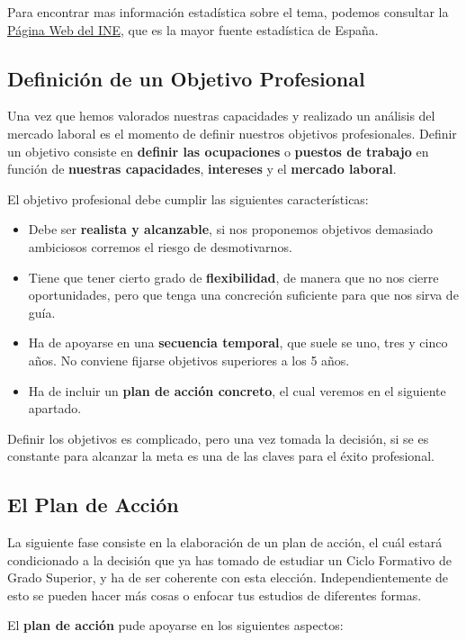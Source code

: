 Para encontrar mas información estadística sobre el tema, podemos consultar la \href{https://www.ine.es/}{Página Web del INE}, que es la mayor fuente estadística de España.

\subsection{Definición de un Objetivo Profesional}
Una vez que hemos valorados nuestras capacidades y realizado un análisis del mercado laboral es el momento de definir nuestros objetivos profesionales. Definir un objetivo consiste en \textbf{definir las ocupaciones} o \textbf{puestos de trabajo} en función de \textbf{nuestras capacidades}, \textbf{intereses} y el \textbf{mercado laboral}.

El objetivo profesional debe cumplir las siguientes características:

\begin{itemize}
    \item Debe ser \textbf{realista y alcanzable}, si nos proponemos objetivos demasiado ambiciosos corremos el riesgo de desmotivarnos.
    \item Tiene que tener cierto grado de \textbf{flexibilidad}, de manera que no nos cierre oportunidades, pero que tenga una concreción suficiente para que nos sirva de guía.
    \item Ha de apoyarse en una \textbf{secuencia temporal}, que suele se uno, tres y cinco años. No conviene fijarse objetivos superiores a los 5 años.
    \item Ha de incluir un \textbf{plan de acción concreto}, el cual veremos en el siguiente apartado.
\end{itemize}

Definir los objetivos es complicado, pero una vez tomada la decisión, si se es constante para alcanzar la meta es una de las claves para el éxito profesional.

\subsection{El Plan de Acción}
La siguiente fase consiste en la elaboración de un plan de acción, el cuál estará condicionado a la decisión que ya has tomado de estudiar un Ciclo Formativo de Grado Superior, y ha de ser coherente con esta elección. Independientemente de esto se pueden hacer más cosas o enfocar tus estudios de diferentes formas.

El \textbf{plan de acción} pude apoyarse en los siguientes aspectos:

